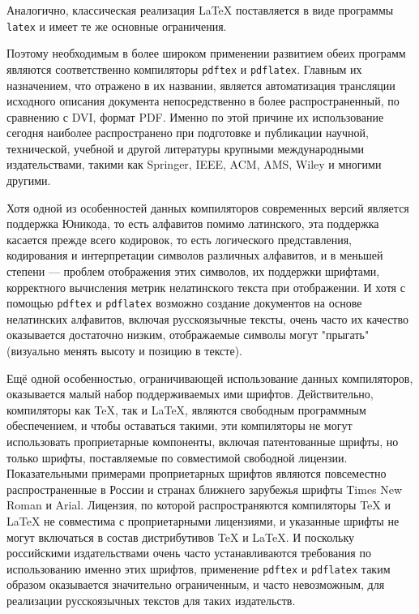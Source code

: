 \documentclass[workbook]{fefudoc}
\begin{document}
Аналогично, классическая реализация \LaTeX{} поставляется в виде программы \texttt{latex} и имеет те же основные ограничения.

Поэтому необходимым в более широком применении развитием обеих программ являются соответственно компиляторы \texttt{pdftex} и \texttt{pdflatex}.
Главным их назначением, что отражено в их названии, является автоматизация трансляции исходного описания документа непосредственно в более распространенный, по сравнению с DVI, формат PDF.
Именно по этой причине их использование сегодня наиболее распространено при подготовке и публикации научной, технической, учебной и другой литературы крупными международными издательствами, такими как Springer, IEEE, ACM, AMS, Wiley и многими другими.

Хотя одной из особенностей данных компиляторов современных версий является поддержка Юникода, то есть алфавитов помимо латинского, эта поддержка касается прежде всего кодировок, то есть логического представления, кодирования и интерпретации символов различных алфавитов, и в меньшей степени --- проблем отображения этих символов, их поддержки шрифтами, корректного вычисления метрик нелатинского текста при отображении.
И хотя с помощью \texttt{pdftex} и \texttt{pdflatex} возможно создание документов на основе нелатинских алфавитов, включая русскоязычные тексты, очень часто их качество оказывается достаточно низким, отображаемые символы могут "прыгать" (визуально менять высоту и позицию в тексте).

Ещё одной особенностью, ограничивающей использование данных компиляторов, оказывается малый набор поддерживаемых ими шрифтов.
Действительно, компиляторы как \TeX{}, так и \LaTeX{}, являются свободным программным обеспечением, и чтобы оставаться такими, эти компиляторы не могут использовать проприетарные компоненты, включая патентованные шрифты, но только шрифты, поставляемые по совместимой свободной лицензии.
Показательными примерами проприетарных шрифтов являются повсеместно распространенные в России и странах ближнего зарубежья шрифты Times New Roman и Arial.
Лицензия, по которой распространяются компиляторы \TeX{} и \LaTeX{} не совместима с проприетарными лицензиями, и указанные шрифты не могут включаться в состав дистрибутивов \TeX{} и \LaTeX{}.
И поскольку российскими издательствами очень часто устанавливаются требования по использованию именно этих шрифтов, применение \texttt{pdftex} и \texttt{pdflatex} таким образом оказывается значительно ограниченным, и часто невозможным, для реализации русскоязычных текстов для таких издательств.
\end{document}
